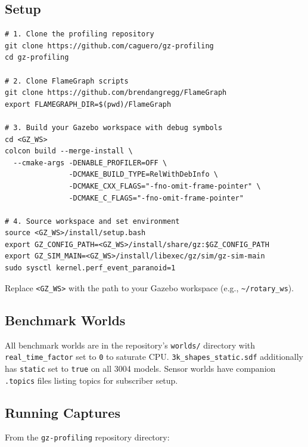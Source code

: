 \documentclass[11pt, a4paper]{article}
\begin{document}
\subsection{Setup}

\begin{verbatim}
# 1. Clone the profiling repository
git clone https://github.com/caguero/gz-profiling
cd gz-profiling

# 2. Clone FlameGraph scripts
git clone https://github.com/brendangregg/FlameGraph
export FLAMEGRAPH_DIR=$(pwd)/FlameGraph

# 3. Build your Gazebo workspace with debug symbols
cd <GZ_WS>
colcon build --merge-install \
  --cmake-args -DENABLE_PROFILER=OFF \
               -DCMAKE_BUILD_TYPE=RelWithDebInfo \
               -DCMAKE_CXX_FLAGS="-fno-omit-frame-pointer" \
               -DCMAKE_C_FLAGS="-fno-omit-frame-pointer"

# 4. Source workspace and set environment
source <GZ_WS>/install/setup.bash
export GZ_CONFIG_PATH=<GZ_WS>/install/share/gz:$GZ_CONFIG_PATH
export GZ_SIM_MAIN=<GZ_WS>/install/libexec/gz/sim/gz-sim-main
sudo sysctl kernel.perf_event_paranoid=1
\end{verbatim}

Replace \texttt{<GZ\_WS>} with the path to your Gazebo workspace (e.g., \texttt{\textasciitilde{}/rotary\_ws}).

\subsection{Benchmark Worlds}

All benchmark worlds are in the repository's \texttt{worlds/} directory with
\texttt{real\_time\_factor} set to \texttt{0} to saturate CPU.
\texttt{3k\_shapes\_static.sdf} additionally has
\texttt{static} set to \texttt{true} on all 3004 models.
Sensor worlds have companion \texttt{.topics} files listing topics for subscriber setup.

\subsection{Running Captures}

From the \texttt{gz-profiling} repository directory:
\end{document}
